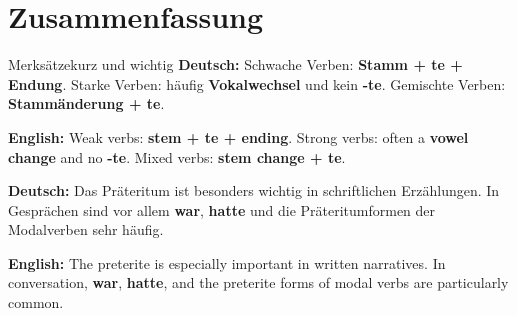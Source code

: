 \documentclass[a4paper,11pt]{article}
\newcommand{\GermanText}[1]{\textbf{Deutsch: }#1\par}
\newcommand{\EnglishText}[1]{{\small\color{SoftGray}\textbf{English: }#1\par}}
\begin{document}
    
    \section{Zusammenfassung}
        
        \begin{grammarentry}{Merksätze}{kurz und wichtig}
            \GermanText{Schwache Verben: \textbf{Stamm + te + Endung}. Starke Verben: häufig \textbf{Vokalwechsel} und kein \textbf{-te}. Gemischte Verben: \textbf{Stammänderung + te}.}
            \EnglishText{Weak verbs: \textbf{stem + te + ending}. Strong verbs: often a \textbf{vowel change} and no \textbf{-te}. Mixed verbs: \textbf{stem change + te}.}
            
            \GermanText{Das Präteritum ist besonders wichtig in schriftlichen Erzählungen. In Gesprächen sind vor allem \textbf{war}, \textbf{hatte} und die Präteritumformen der Modalverben sehr häufig.}
            \EnglishText{The preterite is especially important in written narratives. In conversation, \textbf{war}, \textbf{hatte}, and the preterite forms of modal verbs are particularly common.}
        \end{grammarentry}
\end{document}
